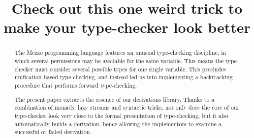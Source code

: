 \documentclass[nonatbib]{sigplanconf}
\begin{document}
\setlength{\pdfpageheight}{\paperheight}
\setlength{\pdfpagewidth}{\paperwidth}

\exclusivelicense


\title{Check out this one weird trick to make your type-checker look better}


\maketitle

\begin{abstract}
  The Mezzo programming language features an unusual type-checking discipline,
  in which several permissions may be available for the same variable. This
  means the type-checker must consider several possible types for one
  single variable. This precludes unification-based type-checking, and instead
  led us into implementing a backtracking procedure that performs forward
  type-checking.

  The present paper extracts the essence of our derivations library. Thanks to a
  combination of monads, lazy streams and syntactic tricks, not only does the
  core of our type-checker look very close to the formal presentation of
  type-checking, but it also automatically builds a derivation, hence allowing
  the implementors to examine a successful or failed derivation.
\end{abstract}







\end{document}
